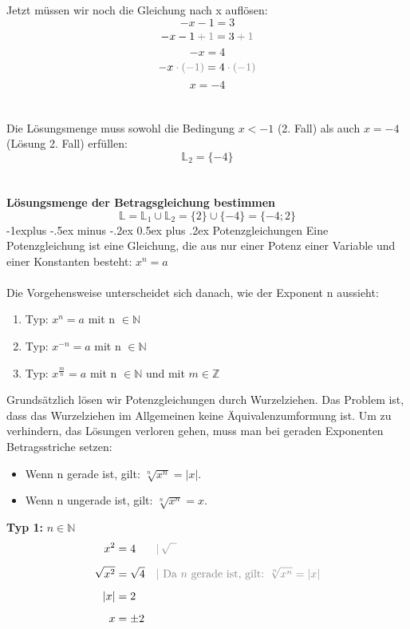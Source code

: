 \documentclass[10pt,landscape]{article}
\makeatletter
\renewcommand{\subsection}{\@startsection{subsection}{2}{0mm}%
                                {-1explus -.5ex minus -.2ex}%
                                {0.5ex plus .2ex}%
                                {\normalfont\normalsize\bfseries}}
\makeatother
\begin{document}
\begin{multicols}{3}
    Jetzt müssen wir noch die Gleichung nach x auflösen:
    \[-x - 1 = 3\]
    \[-x - 1 {\color{gray}\:+\:1} = 3 {\color{gray}\:+\:1}\]
    \[-x = 4\]
    \[-x {\color{gray}\:\cdot\:(-1)} = 4 {\color{gray}\:\cdot\:(-1)}\]
    \[x = -4\] \\~\\
    Die Lösungsmenge muss sowohl die Bedingung $x < -1$ (2. Fall) als auch $x = -4$ (Lösung 2. Fall) erfüllen:
    \[\mathbb{L}_2 = \{-4\}\]\\~\\
    \textbf{Lösungsmenge der Betragsgleichung bestimmen}\\
    \[\mathbb{L} = \mathbb{L}_1 \cup \mathbb{L}_2 = \{2\} \cup \{-4\} = \{-4; 2\}\]
    \newpage
    \subsection{Potenzgleichungen}
    Eine Potenzgleichung ist eine Gleichung, die aus nur einer Potenz einer Variable und einer Konstanten besteht: $x^n = a$ \\~\\
    Die Vorgehensweise unterscheidet sich danach, wie der Exponent n aussieht:
    \begin{enumerate}
        \item Typ: $x^n = a$ mit n $\in \mathbb{N}$
        \item Typ: $x^{-n} = a$ mit n $\in \mathbb{N}$
        \item Typ: $x^{\frac{m}{n}} = a$ mit n $\in \mathbb{N}$ und mit $m \in \mathbb{Z}$
    \end{enumerate}
    Grundsätzlich lösen wir Potenzgleichungen durch Wurzelziehen. Das Problem ist, dass das Wurzelziehen im Allgemeinen keine Äquivalenzumformung ist. Um zu verhindern, das Lösungen verloren gehen, muss man bei geraden Exponenten Betragsstriche setzen:
    \begin{itemize}
        \item Wenn n gerade ist, gilt: $\sqrt[n]{x^n} = |x|$.
        \item Wenn n ungerade ist, gilt: $\sqrt[n]{x^n} = x$.
    \end{itemize}
    \textbf{Typ 1:} $n \in \mathbb{N}$
    \begin{align*} x^2 &= 4 &&{\color{gray}|\, \sqrt{\phantom{x}}} \\[5px] \sqrt{x^2} &= \sqrt{4} &&{\color{gray}| \text{ Da $n$ gerade ist, gilt: } \sqrt[n]{x^n} = |x|} \\[5px] |x| &= 2 \\[5px] x &= \pm 2 \end{align*}

\end{multicols}
\end{document}
